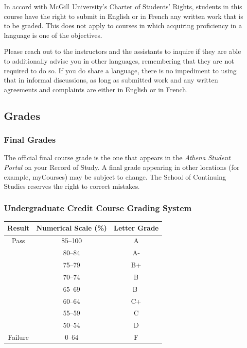 \documentclass{article}
\begin{document}
In accord with McGill University's Charter of Students' Rights,
students in this course have the right to submit in English or in
French any written work that is to be graded. This does not apply to
courses in which acquiring proficiency in a language is one of the
objectives.

Please reach out to the instructors and the assistants to inquire if
they are able to additionally advise you in other languages,
remembering that they are not required to do so. If you do share a
language, there is no impediment to using that in informal
discussions, as long as submitted work and any written agreements and
complaints are either in English or in French.

\subsection{Grades}

\subsubsection{Final Grades}

The official final course grade is the one that appears in the {\em
  Athena Student Portal} on your Record of Study. A final grade
appearing in other locations (for example, myCourses) may be subject
to change.  The School of Continuing Studies reserves the right to
correct mistakes.

\subsubsection{Undergraduate Credit Course Grading System}

\begin{center}
  \begin{tabular}{ccc}
     Result & Numerical Scale (\%) & Letter Grade \\
   \hline
Pass & 85--100 & A  \\
& 80--84 & A- \\
& 75--79 & B+ \\
& 70--74 & B \\
& 65--69 & B- \\
& 60--64& C+ \\
& 55--59 & C \\
& 50--54 & D \\
Failure & 0--64 & F 
  \end{tabular}
  \end{center}
\end{document}
